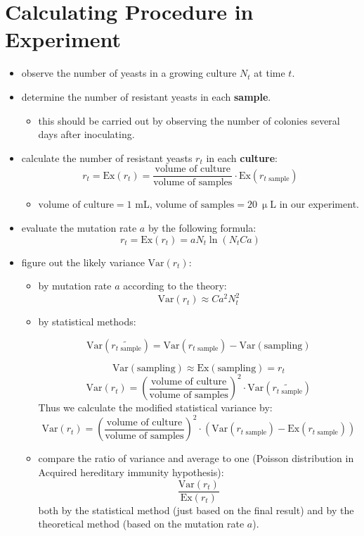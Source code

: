 \documentclass[UTF-8]{article}
\begin{document}
\section{Calculating Procedure in Experiment}
\begin{itemize}
    \item observe the number of yeasts in a growing culture $N_t$ at time $t$.
    \item determine the number of resistant yeasts in each \textbf{sample}.
    \begin{itemize}
        \item this should be carried out by observing the number of colonies several days after inoculating.
    \end{itemize}
    \item calculate the number of resistant yeasts $r_t$ in each \textbf{culture}:
    $$
    r_t=\text{Ex}(r_t)=\frac{\text{volume of culture}}{\text{volume of samples}}\cdot \text{Ex}(r_{t\text{ sample}})
    $$
    \begin{itemize}
        \item $\text{volume of culture}=1$ mL, $\text{volume of samples}=20\ \upmu $L in our experiment.
    \end{itemize}
    \item evaluate the mutation rate $a$ by the following formula:
    $$
    r_t=\text{Ex}(r_t)=aN_t\ln(N_tCa)
    $$
    \item figure out the likely variance $\text{Var}(r_t)$:
    \begin{itemize}
        \item by mutation rate $a$ according to the theory:
        $$
        \text{Var}({r_t})\approx Ca^2N_t^2
        $$
        \item by statistical methods:
        
        $$
        \text{Var}(\tilde{r_{t \text{ sample}}})=\text{Var}(r_{t \text{ sample}})-\text{Var}(\text{sampling})
        $$

        $$
        \text{Var}(\text{sampling})\approx\text{Ex}(\text{sampling})=r_t
        $$
        $$
        \text{Var}({r_t})=\left( \frac{\text{volume of culture}}{\text{volume of samples}} \right)^2\cdot\text{Var}(\tilde{r_{t \text{ sample}}}) 
        $$
        Thus we calculate the modified statistical variance by:
        $$
        \text{Var}({r_t})=\left( \frac{\text{volume of culture}}{\text{volume of samples}} \right)^2\cdot(\text{Var}(r_{t \text{ sample}}) -\text{Ex}(r_{t \text{ sample}}))
        $$
        \item compare the ratio of variance and average to one (Poisson distribution in Acquired hereditary immunity hypothesis):
        $$
        \frac{\text{Var}(r_t)}{\text{Ex}(r_t)}
        $$
        both by the statistical method (just based on the final result) and by the theoretical method (based on the mutation rate $a$).
    \end{itemize}


\end{itemize}
\end{document}
